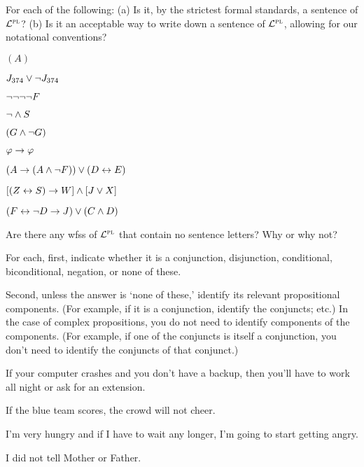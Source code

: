 \solutions
\problempart
\label{pr.wiff$\PL$}
For each of the following: (a) Is it, by the strictest formal standards, a sentence of $\PL$? (b) Is it an acceptable way to write down a sentence of $\PL$, allowing for our notational conventions?
\begin{earg}
\item $(A)$
\item $J_{374} \vee \neg J_{374}$
\item $\neg \neg \neg \neg F$
\item $\neg \wedge S$
\item $(G \wedge \neg G)$
\item $\varphi{} \rightarrow \varphi{}$
\item $(A \rightarrow (A \wedge \neg F)) \vee (D \leftrightarrow E)$
\item $[(Z \leftrightarrow S) \rightarrow W] \wedge [J \vee X]$
\item $(F \leftrightarrow \neg D \rightarrow J) \vee (C \wedge D)$
\end{earg}



\problempart
\begin{earg}
\item Are there any wfss of $\PL$ that contain no sentence letters? Why or why not?
\end{earg}

\problempart
\label{HW2.B}
For each, first, indicate whether it is a conjunction, disjunction, conditional, biconditional, negation, or none of these.

Second, unless the answer is ‘none of these,’ identify its relevant propositional components. (For example, if it is a conjunction, identify the conjuncts; etc.) In the case of complex propositions, you do not need to identify components of the components. (For example, if one of the conjuncts is itself a conjunction, you don’t need to identify the conjuncts of that conjunct.)

	\begin{earg}
		\item If your computer crashes and you don’t have a backup, then you’ll have to work all night or ask for an extension.
		\item If the blue team scores, the crowd will not cheer.
		\item I’m very hungry and if I have to wait any longer, I’m going to start getting angry.
		\item I did not tell Mother or Father.
	\end{earg}
	
